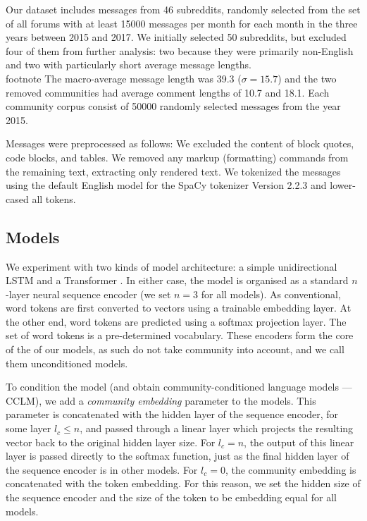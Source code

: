 \documentclass[11pt,a4paper]{article}
\begin{document}
Our dataset includes messages from \num{46} subreddits, 
randomly selected from the set of all forums 
with at least \num{15000} messages per month for each month
in the three years between 2015 and 2017. 
We initially selected \num{50} subreddits, 
but excluded four of them from further analysis: 
two because they were primarily non-English and two with particularly short average message lengths.\\footnote{
The macro-average message length was \num{39.3} ($\sigma=15.7$) and the two removed communities had average comment lengths of \num{10.7} and \num{18.1}.}
Each community corpus consist of \num{50000} randomly selected messages from the year 2015.

Messages were preprocessed as follows: 
We excluded the content of block quotes, code blocks, and tables.
We removed any markup (formatting) commands from the remaining text, extracting only rendered text.
We tokenized the messages using the default English model for the SpaCy tokenizer Version 2.2.3 \citep{Honnibal2017}
and lower-cased all tokens.

\subsection{Models}

We experiment with two kinds of model architecture: a simple
unidirectional LSTM \citep{Hochreiter1997} and a Transformer
\citep{Vaswani2017}.  In either case, the model is organised as a
standard $n$-layer neural sequence encoder (we set $n=3$ for all
models). As conventional, word tokens are first converted to vectors
using a trainable embedding layer. At the other end, word tokens are
predicted using a softmax projection layer. The set of word tokens is
a pre-determined vocabulary.  These encoders form the core of the
of our models, as such do not take community into account, and we call them
unconditioned models.

To condition the model (and obtain community-conditioned language
models --- CCLM), we add a \emph{community embedding} parameter to the
models.  This parameter is concatenated with the hidden layer of the
sequence encoder, for some layer $l_c \leq n$, and passed through a
linear layer which projects the resulting vector back to the original
hidden layer size.  For $l_c = n$, the output of this linear layer is
passed directly to the softmax function, just as the final hidden
layer of the sequence encoder is in other models.  For $l_c=0$, the
community embedding is concatenated with the token embedding.  For
this reason, we set the hidden size of the sequence encoder and the
size of the token to be embedding equal for all models.
\end{document}

